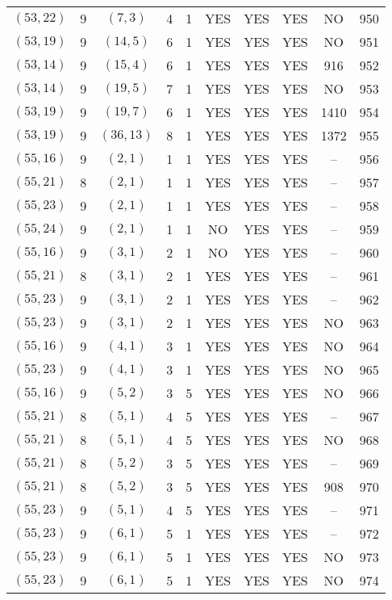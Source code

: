 \begin{longtable}{|c|c|c|c|c|c|c|c|c|c|}
$(53, 22)$ & 9 & $(7, 3)$ & 4 & 1 & YES & YES & YES & NO & 950\\
$(53, 19)$ & 9 & $(14, 5)$ & 6 & 1 & YES & YES & YES & NO & 951\\
$(53, 14)$ & 9 & $(15, 4)$ & 6 & 1 & YES & YES & YES & 916 & 952\\
$(53, 14)$ & 9 & $(19, 5)$ & 7 & 1 & YES & YES & YES & NO & 953\\
$(53, 19)$ & 9 & $(19, 7)$ & 6 & 1 & YES & YES & YES & 1410 & 954\\
$(53, 19)$ & 9 & $(36, 13)$ & 8 & 1 & YES & YES & YES & 1372 & 955\\
$(55, 16)$ & 9 & $(2, 1)$ & 1 & 1 & YES & YES & YES & -- & 956\\
$(55, 21)$ & 8 & $(2, 1)$ & 1 & 1 & YES & YES & YES & -- & 957\\
$(55, 23)$ & 9 & $(2, 1)$ & 1 & 1 & YES & YES & YES & -- & 958\\
$(55, 24)$ & 9 & $(2, 1)$ & 1 & 1 & NO & YES & YES & -- & 959\\
$(55, 16)$ & 9 & $(3, 1)$ & 2 & 1 & NO & YES & YES & -- & 960\\
$(55, 21)$ & 8 & $(3, 1)$ & 2 & 1 & YES & YES & YES & -- & 961\\
$(55, 23)$ & 9 & $(3, 1)$ & 2 & 1 & YES & YES & YES & -- & 962\\
$(55, 23)$ & 9 & $(3, 1)$ & 2 & 1 & YES & YES & YES & NO & 963\\
$(55, 16)$ & 9 & $(4, 1)$ & 3 & 1 & YES & YES & YES & NO & 964\\
$(55, 23)$ & 9 & $(4, 1)$ & 3 & 1 & YES & YES & YES & NO & 965\\
$(55, 16)$ & 9 & $(5, 2)$ & 3 & 5 & YES & YES & YES & NO & 966\\
$(55, 21)$ & 8 & $(5, 1)$ & 4 & 5 & YES & YES & YES & -- & 967\\
$(55, 21)$ & 8 & $(5, 1)$ & 4 & 5 & YES & YES & YES & NO & 968\\
$(55, 21)$ & 8 & $(5, 2)$ & 3 & 5 & YES & YES & YES & -- & 969\\
$(55, 21)$ & 8 & $(5, 2)$ & 3 & 5 & YES & YES & YES & 908 & 970\\
$(55, 23)$ & 9 & $(5, 1)$ & 4 & 5 & YES & YES & YES & -- & 971\\
$(55, 23)$ & 9 & $(6, 1)$ & 5 & 1 & YES & YES & YES & -- & 972\\
$(55, 23)$ & 9 & $(6, 1)$ & 5 & 1 & YES & YES & YES & NO & 973\\
$(55, 23)$ & 9 & $(6, 1)$ & 5 & 1 & YES & YES & YES & NO & 974\\

\end{longtable}
